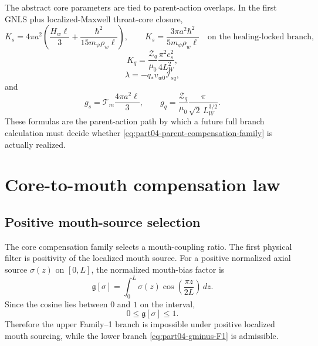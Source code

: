 The abstract core parameters are tied to parent-action overlaps.  In the first GNLS plus localized-Maxwell throat-core closure,
\begin{equation}
\label{eq:part04-Ks-parent}
K_s=4\pi a^2\left(\frac{H_w\ell}{3}+\frac{\hbar^2}{15m_\psi\rho_w\ell}\right),
\qquad
K_s=\frac{3\pi a^2\hbar^2}{5m_\psi\rho_w\ell}
\quad\text{on the healing-locked branch},
\end{equation}
\begin{equation}
\label{eq:part04-Kq-parent}
K_q=\frac{\mathcal Z_q}{\mu_0}\frac{\pi^2c_s^2}{4L_W^2},
\end{equation}
\begin{equation}
\label{eq:part04-lambda-parent}
\lambda=-q_*v_{w0}\mathcal I_{sq},
\end{equation}
and
\begin{equation}
\label{eq:part04-gs-gq-parent}
g_s=\mathcal T_m\frac{4\pi a^2\ell}{3},
\qquad
g_q=\frac{\mathcal Z_q}{\mu_0}\frac{\pi}{\sqrt2\,L_W^{3/2}}.
\end{equation}
These formulas are the parent-action path by which a future full branch calculation must decide whether \eqref{eq:part04-parent-compensation-family} is actually realized.

\section{Core-to-mouth compensation law}
\label{sec:part04_geometry_retarded_mouth:core-to-mouth-compensation-law}

\subsection{Positive mouth-source selection}
\label{subsec:part04-positive-mouth-selection}

The core compensation family selects a mouth-coupling ratio.  The first physical filter is positivity of the localized mouth source.  For a positive normalized axial source \(\sigma(z)\) on \([0,L]\), the normalized mouth-bias factor is
\begin{equation}
\label{eq:part04-gsigma-def}
\mathfrak g[\sigma]
=
\int_0^L\sigma(z)\cos\left(\frac{\pi z}{2L}\right)\,dz.
\end{equation}
Since the cosine lies between \(0\) and \(1\) on the interval,
\begin{equation}
\label{eq:part04-positive-source-bound}
0\le\mathfrak g[\sigma]\le1.
\end{equation}
Therefore the upper Family--1 branch is impossible under positive localized mouth sourcing, while the lower branch \eqref{eq:part04-gminus-F1} is admissible.

